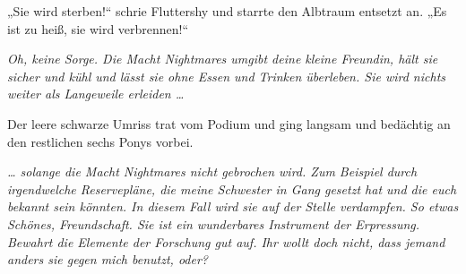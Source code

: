„Sie wird sterben!“ schrie Fluttershy und starrte den Albtraum entsetzt an.
„Es ist zu heiß, sie wird verbrennen!“

\emph{Oh, keine Sorge. Die Macht Nightmares umgibt deine kleine Freundin, hält sie sicher und kühl und lässt sie ohne Essen und Trinken überleben. Sie wird nichts weiter als Langeweile erleiden …}

Der leere schwarze Umriss trat vom Podium und ging langsam und bedächtig an den restlichen sechs Ponys vorbei.

\emph{… solange die Macht Nightmares nicht gebrochen wird. Zum Beispiel durch irgendwelche Reservepläne, die meine Schwester in Gang gesetzt hat und die euch bekannt sein könnten. In diesem Fall wird sie auf der Stelle verdampfen. So etwas Schönes, Freundschaft. Sie ist ein wunderbares Instrument der Erpressung. Bewahrt die Elemente der Forschung gut auf. Ihr wollt doch nicht, dass jemand anders sie gegen mich benutzt, oder?}


